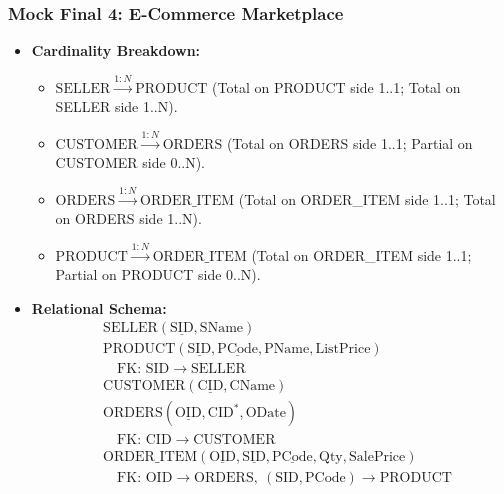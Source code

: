 \documentclass[10pt,a4paper]{article}
\begin{document}
\subsubsection*{Mock Final 4: E-Commerce Marketplace}
\begin{itemize}
  \item \textbf{Cardinality Breakdown:}
  \begin{itemize}
    \item $\mathrm{SELLER} \xrightarrow{1:N} \mathrm{PRODUCT}$ (Total on PRODUCT side 1..1; Total on SELLER side 1..N).
    \item $\mathrm{CUSTOMER} \xrightarrow{1:N} \mathrm{ORDERS}$ (Total on ORDERS side 1..1; Partial on CUSTOMER side 0..N).
    \item $\mathrm{ORDERS} \xrightarrow{1:N} \mathrm{ORDER\_ITEM}$ (Total on ORDER\_ITEM side 1..1; Total on ORDERS side 1..N).
    \item $\mathrm{PRODUCT} \xrightarrow{1:N} \mathrm{ORDER\_ITEM}$ (Total on ORDER\_ITEM side 1..1; Partial on PRODUCT side 0..N).
  \end{itemize}
  \item \textbf{Relational Schema:}
  \begin{align*}
    &\mathrm{SELLER}(\underline{\mathrm{SID}}, \mathrm{SName})\\
    &\mathrm{PRODUCT}(\underline{\mathrm{SID}}, \underline{\mathrm{PCode}}, \mathrm{PName}, \mathrm{ListPrice})\\
    &\quad \text{FK: } \mathrm{SID} \to \mathrm{SELLER}\\
    &\mathrm{CUSTOMER}(\underline{\mathrm{CID}}, \mathrm{CName})\\
    &\mathrm{ORDERS}(\underline{\mathrm{OID}}, \mathrm{CID}^*, \mathrm{ODate})\\
    &\quad \text{FK: } \mathrm{CID} \to \mathrm{CUSTOMER}\\
    &\mathrm{ORDER\_ITEM}(\underline{\mathrm{OID}}, \underline{\mathrm{SID}}, \underline{\mathrm{PCode}}, \mathrm{Qty}, \mathrm{SalePrice})\\
    &\quad \text{FK: } \mathrm{OID} \to \mathrm{ORDERS},\ (\mathrm{SID}, \mathrm{PCode}) \to \mathrm{PRODUCT}
  \end{align*}
\end{itemize}
\end{document}
